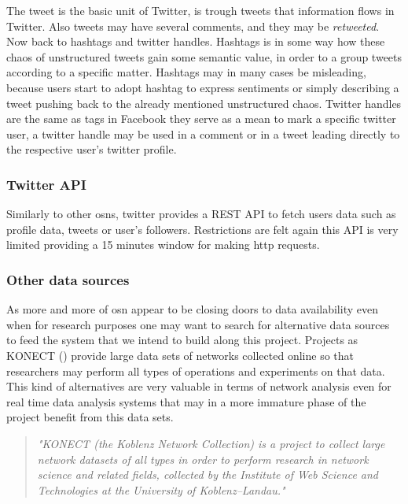 \indent The tweet is the basic unit of Twitter, is trough tweets that information flows in Twitter. Also tweets may have several comments, and they may
be \textit{retweeted}. Now back to hashtags and twitter handles. Hashtags is in some way how these chaos of unstructured tweets gain some semantic
value, in order to a group tweets according to a specific matter. Hashtags may in many cases be misleading, because users
start to adopt hashtag to express sentiments or simply describing a tweet pushing back to the already mentioned unstructured chaos.
Twitter handles are the same as tags in Facebook they serve as a mean to mark a specific twitter user, a twitter handle may be used in a comment or
in a tweet leading directly to the respective user's twitter profile.

\subsubsection*{Twitter API}
Similarly to other \glspl{osn}, twitter provides a REST API to fetch users data such as profile data, tweets or user's followers. Restrictions are felt
again this API is very limited providing a 15 minutes window for making http requests.

\subsubsection*{Other data sources}
\label{sec:otherdatasources}
As more and more of \gls{osn} appear to be closing doors to data availability even when for research purposes one may
want to search for alternative data sources to feed the system that we intend to build along this project. Projects as
KONECT (\cite{kunegis2013konect}) provide large data sets of networks collected online so that researchers may
perform all types of operations and experiments on that data. This kind of alternatives are very valuable in terms of network
analysis even for real time data analysis systems that may in a more immature phase of the project benefit from this data sets.

\begin{quote}
\textit{"KONECT (the Koblenz Network Collection) is a project to collect large network datasets of all
types in order to perform research in network science and related fields, collected by the Institute
of Web Science and Technologies at the University of Koblenz–Landau."} \cite{kunegis2013konect}
\end{quote}

